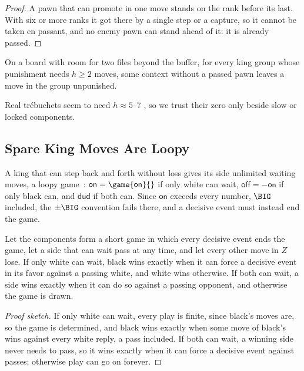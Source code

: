 \begin{proof}
A pawn that can promote in one move stands on the rank before its last. With six or more ranks it got there by a
single step or a capture, so it cannot be taken en passant, and no enemy pawn can stand ahead of it: it is
already passed.
\end{proof}

\begin{conjecture}\label{conj:horizon2}
On a board with room for two files beyond the buffer, for every king group whose punishment needs $h\ge2$
moves, some context without a passed pawn leaves a move in the group unpunished.
\end{conjecture}

Real tr\'ebuchets seem to need $h\approx5$--$7$ , so we trust their zero only beside slow or locked components.

\subsection{Spare King Moves Are Loopy}

A king that can step back and forth without loss gives its side unlimited waiting moves, a loopy
game~\cite{WinningWays,Siegel2013}: $\textsf{on}=\game{\textsf{on}}{}$ if only white can wait,
$\textsf{off}=-\textsf{on}$ if only black can, and $\textsf{dud}$ if both can. Since $\textsf{on}$ exceeds every number, $\BIG$ included, the $\pm\BIG$ convention fails there, and a
decisive event must instead end the game.

\begin{theorem}\label{thm:loopy}
Let the components form a short game in which every decisive event ends the game, let a side that can wait pass
at any time, and let every other move in $Z$ lose. If only white can wait, black wins exactly when it can force a decisive
event in its favor against a passing white, and white wins otherwise. If both can wait, a side wins exactly when
it can do so against a passing opponent, and otherwise the game is drawn.
\end{theorem}

\begin{proof}[Proof sketch]
If only white can wait, every play is finite, since black's moves are, so the game is determined, and black
wins exactly when some move of black's wins against every white reply, a pass included. If both can wait, a
winning side never needs to pass, so it wins exactly when it can force a decisive event against passes;
otherwise play can go on forever.
\end{proof}

